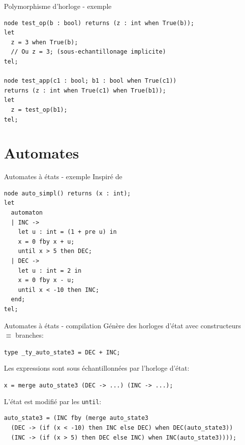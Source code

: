 \documentclass[xcolor={svgnames},aspectratio=169]{beamer}
\begin{document}
\begin{frame}[fragile]{Polymorphisme d'horloge - exemple}
\begin{lstlisting}
node test_op(b : bool) returns (z : int when True(b));
let
  z = 3 when True(b);
  // Ou z = 3; (sous-echantillonage implicite)
tel;

node test_app(c1 : bool; b1 : bool when True(c1))
returns (z : int when True(c1) when True(b1));
let
  z = test_op(b1);
tel;
\end{lstlisting}
\end{frame}

\section{Automates}

\begin{frame}[fragile]{Automates à états - exemple}
  Inspiré de~\citep{Colaco05}
\begin{lstlisting}
node auto_simpl() returns (x : int);
let
  automaton
  | INC ->
    let u : int = (1 + pre u) in
    x = 0 fby x + u;
    until x > 5 then DEC;
  | DEC ->
    let u : int = 2 in
    x = 0 fby x - u;
    until x < -10 then INC;
  end;
tel;
\end{lstlisting}
\end{frame}

\begin{frame}[fragile]{Automates à états - compilation}
  \lstset{basicstyle=\tt\scriptsize}
  Génère des horloges d'état avec constructeurs $\equiv$ branches:

  \lstinline{type _ty_auto_state3 = DEC + INC;}

  Les expressions sont sous échantillonnées par l'horloge d'état:

  \lstinline{x = merge auto_state3 (DEC -> ...) (INC -> ...);}

  L'état est modifié par les \lstinline{until}:

  \begin{lstlisting}
auto_state3 = (INC fby (merge auto_state3
  (DEC -> (if (x < -10) then INC else DEC) when DEC(auto_state3))
  (INC -> (if (x > 5) then DEC else INC) when INC(auto_state3))));
  \end{lstlisting}
\end{frame}
\end{document}
